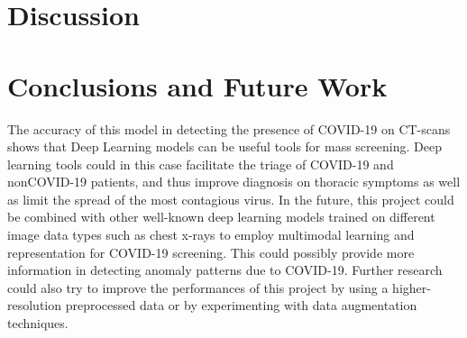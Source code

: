 \documentclass[12pt, letterpaper]{article}
\begin{document}
\newpage
\section{Discussion}


\newpage
\section{Conclusions and Future Work}
The accuracy of this model in detecting the presence of COVID-19 on CT-scans shows that Deep Learning models can be useful tools for mass screening. Deep learning tools could in this case facilitate the triage of COVID-19 and nonCOVID-19 patients, and thus improve diagnosis on thoracic symptoms as well as limit the spread of the most contagious virus. In the future, this project could be combined with other well-known deep learning models trained on different image data types such as chest x-rays to employ multimodal learning and representation for COVID-19 screening. This could possibly provide more information in detecting anomaly patterns due to COVID-19. Further research could also try to improve the performances of this project by using a higher-resolution preprocessed data or by experimenting with data augmentation techniques.

\newpage


\nocite{*}
\end{document}
